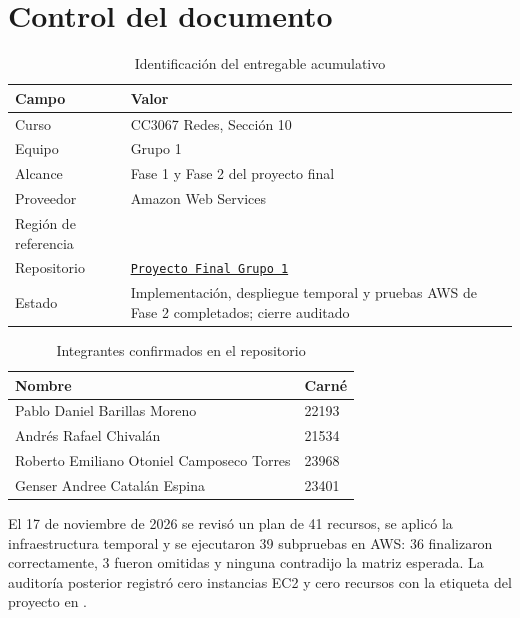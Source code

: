 \chapter*{Control del documento}

\begin{table}[H]
\centering
\caption{Identificación del entregable acumulativo}
\begin{tabularx}{\textwidth}{@{}p{4.2cm}Y@{}}
\toprule
\textbf{Campo} & \textbf{Valor} \\
\midrule
Curso & CC3067 Redes, Sección 10 \\
Equipo & Grupo 1 \\
Alcance & Fase 1 y Fase 2 del proyecto final \\
Proveedor & Amazon Web Services \\
Región de referencia &  \\
Repositorio & \href{https://github.com/DanielBarillasM/Proyecto-final_Grupo-1_Redes_Sec-10.git}{\texttt{Proyecto Final Grupo 1}} \\
Estado & Implementación, despliegue temporal y pruebas AWS de Fase 2 completados; cierre auditado \\
\bottomrule
\end{tabularx}
\end{table}

\begin{table}[H]
\centering
\caption{Integrantes confirmados en el repositorio}
\begin{tabularx}{\textwidth}{@{}Y p{4.2cm}@{}}
\toprule
\textbf{Nombre} & \textbf{Carné} \\
\midrule
Pablo Daniel Barillas Moreno & 22193 \\
Andrés Rafael Chivalán & 21534 \\
Roberto Emiliano Otoniel Camposeco Torres & 23968 \\
Genser Andree Catalán Espina & 23401 \\
\bottomrule
\end{tabularx}
\end{table}

\begin{infobox}
El 17 de noviembre de 2026 se revisó un plan de 41 recursos, se aplicó la infraestructura temporal
y se ejecutaron 39 subpruebas en AWS: 36 finalizaron correctamente, 3 fueron omitidas y ninguna
contradijo la matriz esperada. La auditoría posterior registró cero instancias EC2 y cero recursos
con la etiqueta del proyecto en .
\end{infobox}
